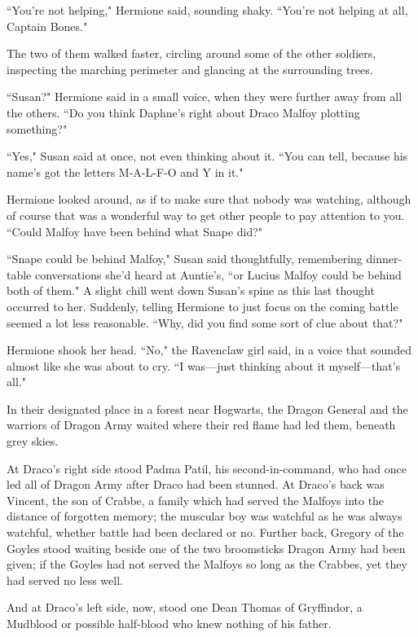 ``You're not helping," Hermione said, sounding shaky. ``You're not helping at all, Captain Bones."

The two of them walked faster, circling around some of the other soldiers, inspecting the marching perimeter and glancing at the surrounding trees.

``Susan?" Hermione said in a small voice, when they were further away from all the others. ``Do you think Daphne's right about Draco Malfoy plotting something?"

``Yes," Susan said at once, not even thinking about it. ``You can tell, because his name's got the letters M-A-L-F-O and Y in it."

Hermione looked around, as if to make sure that nobody was watching, although of course that was a wonderful way to get other people to pay attention to you. ``Could Malfoy have been behind what Snape did?"

``Snape could be behind Malfoy," Susan said thoughtfully, remembering dinner-table conversations she'd heard at Auntie's, ``or Lucius Malfoy could be behind both of them." A slight chill went down Susan's spine as this last thought occurred to her. Suddenly, telling Hermione to just focus on the coming battle seemed a lot less reasonable. ``Why, did you find some sort of clue about that?"

Hermione shook her head. ``No," the Ravenclaw girl said, in a voice that sounded almost like she was about to cry. ``I was—just thinking about it myself—that's all."

\later

In their designated place in a forest near Hogwarts, the Dragon General and the warriors of Dragon Army waited where their red flame had led them, beneath grey skies.

At Draco's right side stood Padma Patil, his second-in-command, who had once led all of Dragon Army after Draco had been stunned. At Draco's back was Vincent, the son of Crabbe, a family which had served the Malfoys into the distance of forgotten memory; the muscular boy was watchful as he was always watchful, whether battle had been declared or no. Further back, Gregory of the Goyles stood waiting beside one of the two broomsticks Dragon Army had been given; if the Goyles had not served the Malfoys so long as the Crabbes, yet they had served no less well.

And at Draco's left side, now, stood one Dean Thomas of Gryffindor, a Mudblood or possible half-blood who knew nothing of his father.

